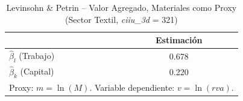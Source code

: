 \begin{table}[H]
\centering
\caption{Levinsohn \& Petrin -- Valor Agregado, Materiales como Proxy (Sector Textil, \textit{ciiu\_3d} = 321)}
\begin{tabular}{lc}
\toprule
 & Estimación \\
\midrule
$\hat{\beta}_l$ (Trabajo) & 0.678 \\
$\hat{\beta}_k$ (Capital) & 0.220 \\
\bottomrule
\multicolumn{2}{l}{\small Proxy: $m = \ln(M)$. Variable dependiente: $v = \ln(\mathit{rva})$.}
\end{tabular}
\end{table}
